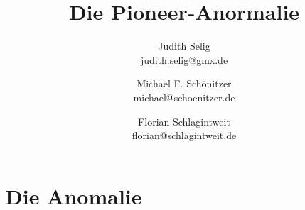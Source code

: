 \documentclass[a4paper,10pt]{article}
\title{Die Pioneer-Anormalie}
\author{Judith Selig\\judith.selig@gmx.de \and Michael F. Schönitzer\\michael@schoenitzer.de \and Florian Schlagintweit\\florian@schlagintweit.de}	%
\begin{document}
\maketitle

% 




\section{Die Anomalie}









{}

\end{document}
